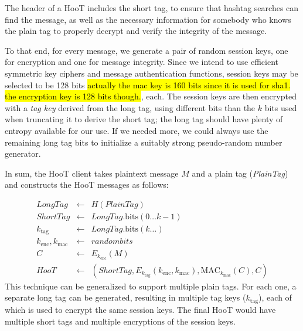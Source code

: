 %
The header of a HooT includes the short tag, to ensure that hashtag
searches can find the message, as well as the necessary information for
somebody who knows the plain tag to properly decrypt and verify the
integrity of the message.

To that end, for every message, we generate a pair of random session
keys, one for encryption and one for message integrity. Since we intend
to use efficient symmetric key ciphers and message authentication
functions, session keys may be selected to be 128 bits \hl{actually the
  mac key is 160 bits since it is used for sha1. the encryption key is
  128 bits though.},  each. The session keys
are then encrypted with a {\em tag key} derived from the long tag, using
different bits than the $k$ bits used when truncating it to derive the
short tag; the long tag should have plenty of entropy available for our
use. 
If we needed more, we could always use the remaining long tag bits
to initialize a suitably strong pseudo-random number generator.

In sum, the HooT client takes plaintext message $M$ and a plain tag
({\em PlainTag}) and constructs the HooT messages as follows:
%

\begin{eqnarray*}
\mathit{LongTag} & \leftarrow & H(\mathit{PlainTag}) \\
\mathit{ShortTag} & \leftarrow & \mathit{LongTag}.\mathrm{bits}(0 \ldots k-1) \\
k_{\mathrm{tag}} & \leftarrow & \mathit{LongTag}.\mathrm{bits}(k \ldots) \\
k_{\mathrm{enc}}, k_{\mathrm{mac}} & \leftarrow & \mathit{random bits} \\
C & \leftarrow & E_{k_{\mathrm{enc}}}(M) \\
\mathit{HooT}  & \leftarrow &  \left(\mathit{ShortTag}, E_{k_{\mathrm{tag}}} \left(k_{\mathrm{enc}}, k_{\mathrm{mac}}\right), \mathrm{MAC}_{k_{\mathrm{mac}}}(C), C\right)
\end{eqnarray*}
%
This technique can be generalized to support multiple plain tags. For
each one, a separate long tag can be generated, resulting in multiple
tag keys ($k_\mathrm{tag}$), each of which is used to encrypt the same
session keys. The final HooT would have multiple short tags and multiple
encryptions of the session keys.

